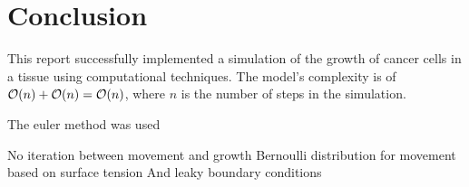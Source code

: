 \chapter{Conclusion}

This report successfully implemented a simulation of the growth of cancer cells in a tissue using computational techniques.
The model's complexity is of $\mathcal{O}(n) + \mathcal{O}(n) = \mathcal{O}(n)$, where $n$ is the number of steps in the simulation.

The euler method was used 

No iteration between movement and growth
Bernoulli distribution for movement based on surface tension
And leaky boundary conditions

